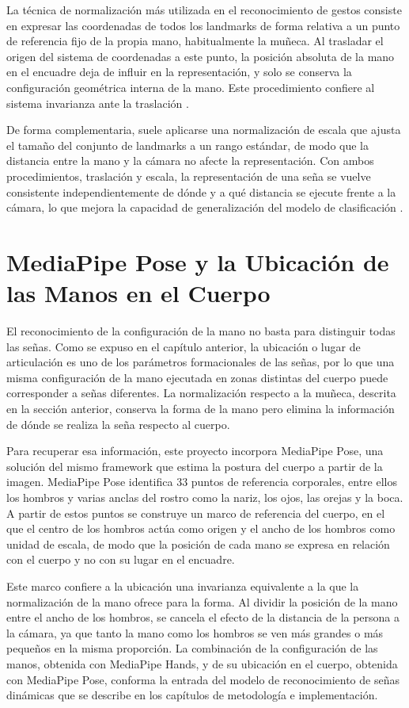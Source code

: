 La técnica de normalización más utilizada en el reconocimiento de gestos consiste en
expresar las coordenadas de todos los landmarks de forma relativa a un punto de referencia
fijo de la propia mano, habitualmente la muñeca. Al trasladar el origen del sistema de
coordenadas a este punto, la posición absoluta de la mano en el encuadre deja de influir en
la representación, y solo se conserva la configuración geométrica interna de la mano. Este
procedimiento confiere al sistema invarianza ante la traslación \cite{zhang_mediapipe_2020}.

De forma complementaria, suele aplicarse una normalización de escala que ajusta el tamaño
del conjunto de landmarks a un rango estándar, de modo que la distancia entre la mano y la
cámara no afecte la representación. Con ambos procedimientos, traslación y escala, la
representación de una seña se vuelve consistente independientemente de dónde y a qué
distancia se ejecute frente a la cámara, lo que mejora la capacidad de generalización del
modelo de clasificación \cite{szeliski_cv_2022}.

\section{MediaPipe Pose y la Ubicación de las Manos en el Cuerpo}

El reconocimiento de la configuración de la mano no basta para distinguir todas las señas.
Como se expuso en el capítulo anterior, la ubicación o lugar de articulación es uno de los
parámetros formacionales de las señas, por lo que una misma configuración de la mano
ejecutada en zonas distintas del cuerpo puede corresponder a señas diferentes. La
normalización respecto a la muñeca, descrita en la sección anterior, conserva la forma de la
mano pero elimina la información de dónde se realiza la seña respecto al cuerpo.

Para recuperar esa información, este proyecto incorpora MediaPipe Pose, una solución del
mismo framework que estima la postura del cuerpo a partir de la imagen. MediaPipe Pose
identifica 33 puntos de referencia corporales, entre ellos los hombros y varias anclas del
rostro como la nariz, los ojos, las orejas y la boca. A partir de estos puntos se construye
un marco de referencia del cuerpo, en el que el centro de los hombros actúa como origen y el
ancho de los hombros como unidad de escala, de modo que la posición de cada mano se expresa
en relación con el cuerpo y no con su lugar en el encuadre.

Este marco confiere a la ubicación una invarianza equivalente a la que la normalización de
la mano ofrece para la forma. Al dividir la posición de la mano entre el ancho de los
hombros, se cancela el efecto de la distancia de la persona a la cámara, ya que tanto la mano
como los hombros se ven más grandes o más pequeños en la misma proporción. La combinación de
la configuración de las manos, obtenida con MediaPipe Hands, y de su ubicación en el cuerpo,
obtenida con MediaPipe Pose, conforma la entrada del modelo de reconocimiento de señas
dinámicas que se describe en los capítulos de metodología e implementación.
